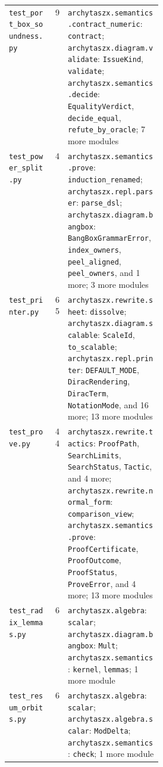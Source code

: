 \begin{xltabular}{\linewidth}{@{}>{\raggedright\arraybackslash}p{0.3\linewidth}r>{\raggedright\arraybackslash}X@{}}
\texttt{test\_\allowbreak{}port\_\allowbreak{}box\_\allowbreak{}soundness.py} & 9 & \texttt{archytaszx.\allowbreak{}semantics.\allowbreak{}contract\_\allowbreak{}numeric}: \texttt{contract}; \texttt{archytaszx.\allowbreak{}diagram.\allowbreak{}validate}: \texttt{IssueKind}, \texttt{validate}; \texttt{archytaszx.\allowbreak{}semantics.\allowbreak{}decide}: \texttt{EqualityVerdict}, \texttt{decide\_\allowbreak{}equal}, \texttt{refute\_\allowbreak{}by\_\allowbreak{}oracle}; 7 more modules \\
\texttt{test\_\allowbreak{}power\_\allowbreak{}split.py} & 4 & \texttt{archytaszx.\allowbreak{}semantics.\allowbreak{}prove}: \texttt{induction\_\allowbreak{}renamed}; \texttt{archytaszx.\allowbreak{}repl.\allowbreak{}parser}: \texttt{parse\_\allowbreak{}dsl}; \texttt{archytaszx.\allowbreak{}diagram.\allowbreak{}bangbox}: \texttt{BangBoxGrammarError}, \texttt{index\_\allowbreak{}owners}, \texttt{peel\_\allowbreak{}aligned}, \texttt{peel\_\allowbreak{}owners}, and 1 more; 3 more modules \\
\texttt{test\_\allowbreak{}printer.py} & 65 & \texttt{archytaszx.\allowbreak{}rewrite.\allowbreak{}sheet}: \texttt{dissolve}; \texttt{archytaszx.\allowbreak{}diagram.\allowbreak{}scalable}: \texttt{ScaleId}, \texttt{to\_\allowbreak{}scalable}; \texttt{archytaszx.\allowbreak{}repl.\allowbreak{}printer}: \texttt{DEFAULT\_\allowbreak{}MODE}, \texttt{DiracRendering}, \texttt{DiracTerm}, \texttt{NotationMode}, and 16 more; 13 more modules \\
\texttt{test\_\allowbreak{}prove.py} & 44 & \texttt{archytaszx.\allowbreak{}rewrite.\allowbreak{}tactics}: \texttt{ProofPath}, \texttt{SearchLimits}, \texttt{SearchStatus}, \texttt{Tactic}, and 4 more; \texttt{archytaszx.\allowbreak{}rewrite.\allowbreak{}normal\_\allowbreak{}form}: \texttt{comparison\_\allowbreak{}view}; \texttt{archytaszx.\allowbreak{}semantics.\allowbreak{}prove}: \texttt{ProofCertificate}, \texttt{ProofOutcome}, \texttt{ProofStatus}, \texttt{ProveError}, and 4 more; 13 more modules \\
\texttt{test\_\allowbreak{}radix\_\allowbreak{}lemmas.py} & 6 & \texttt{archytaszx.\allowbreak{}algebra}: \texttt{scalar}; \texttt{archytaszx.\allowbreak{}diagram.\allowbreak{}bangbox}: \texttt{Mult}; \texttt{archytaszx.\allowbreak{}semantics}: \texttt{kernel}, \texttt{lemmas}; 1 more module \\
\texttt{test\_\allowbreak{}resum\_\allowbreak{}orbits.py} & 6 & \texttt{archytaszx.\allowbreak{}algebra}: \texttt{scalar}; \texttt{archytaszx.\allowbreak{}algebra.\allowbreak{}scalar}: \texttt{ModDelta}; \texttt{archytaszx.\allowbreak{}semantics}: \texttt{check}; 1 more module \\

\end{xltabular}

